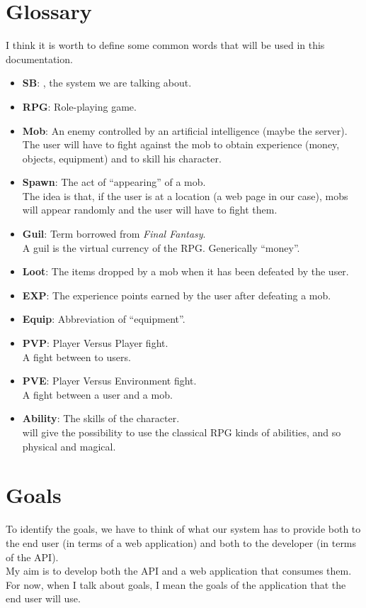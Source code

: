 	\section{Glossary}
	I think it is worth to define some common words that will be used in this documentation.
	\begin{itemize}
		\item \textbf{SB}: \SocialBattle{}, the system we are talking about.
		\item \textbf{RPG}: Role-playing game.
		\item \textbf{Mob}: An enemy controlled by an artificial intelligence (maybe the server).\\
			The user will have to fight against the mob to obtain experience (money, objects, equipment)
			and to skill his character.
		\item \textbf{Spawn}: The act of ``appearing'' of a mob.\\
			The idea is that, if the user is at a location (a web page in our case), mobs will appear 
			randomly and the user will have to fight them.
		\item \textbf{Guil}: Term borrowed from \textit{Final Fantasy}.\\
			A guil is the virtual currency of the RPG. Generically ``money''.
		\item \textbf{Loot}: The items dropped by a mob when it has been defeated by the user.
		\item \textbf{EXP}: The experience points earned by the user after defeating a mob.
		\item \textbf{Equip}: Abbreviation of ``equipment''.
		\item \textbf{PVP}: Player Versus Player fight.\\
			A fight between to users.
		\item \textbf{PVE}: Player Versus Environment fight.\\
			A fight between a user and a mob.
		\item \textbf{Ability}: The skills of the character.\\
		\SocialBattle{} will give the possibility to use the classical RPG kinds of abilities, and so physical and magical.
	\end{itemize}

	\section{Goals}
	To identify the goals, we have to think of what our system has to provide both to the end user 
	(in terms of a web application) and both to the developer (in terms of the API).\\
	My aim is to develop both the API and a web application that consumes them.\\
	For now, when I talk about goals, I mean the goals of the application that the end user will use.

